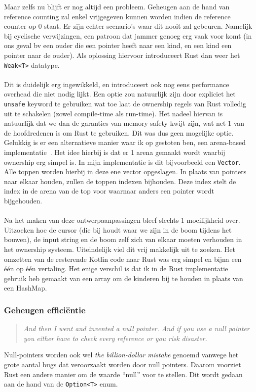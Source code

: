 Maar zelfs nu blijft er nog altijd een probleem.
Geheugen aan de hand van reference counting zal enkel vrijgegeven kunnen worden indien de reference counter op 0 staat.
Er zijn echter scenario's waar dit nooit zal gebeuren.
Namelijk bij cyclische verwijzingen, een patroon dat jammer genoeg erg vaak voor komt (in ons geval bv een ouder die een pointer heeft naar een kind, en een kind een pointer naar de ouder).
Als oplossing hiervoor introduceert Rust dan weer het \texttt{Weak<T>} datatype.
\\ \\
Dit is duidelijk erg ingewikkeld, en introduceert ook nog eens performance overhead die niet nodig lijkt.
Een optie zou natuurlijk zijn door expliciet het \texttt{unsafe} keyword te gebruiken wat toe laat de ownership regels van Rust volledig uit te schakelen (zowel compile-time als run-time).
Het nadeel hiervan is natuurlijk dat we dan de garanties van memory safety kwijt zijn, wat net 1 van de hoofdredenen is om Rust te gebruiken.
Dit was dus geen mogelijke optie.
Gelukkig is er een alternatieve manier waar ik op gestoten ben, een arena-based implementatie~\cite{rust_arena_trees}.
Het idee hierbij is dat er 1 arena gemaakt wordt waarbij ownership erg simpel is.
In mijn implementatie is dit bijvoorbeeld een \texttt{Vector}.
Alle toppen worden hierbij in deze ene vector opgeslagen.
In plaats van pointers naar elkaar houden, zullen de toppen indexen bijhouden.
Deze index stelt de index in de arena van de top voor waarnaar anders een pointer wordt bijgehouden.
\\ \\
Na het maken van deze ontwerpaanpassingen bleef slechts 1 moeilijkheid over.
Uitzoeken hoe de cursor (die bij houdt waar we zijn in de boom tijdens het bouwen), de input string en de boom zelf zich van elkaar moeten verhouden in het ownership systeem.
Uiteindelijk viel dit vrij makkelijk uit te zoeken.
Het omzetten van de resterende Kotlin code naar Rust was erg simpel en bijna een één op één vertaling.
Het enige verschil is dat ik in de Rust implementatie gebruik heb gemaakt van een array om de kinderen bij te houden in plaats van een HashMap.

\subsubsection{Geheugen efficiëntie}
\begin{quote}
    \textit{And then I went and invented a null pointer.
    And if you use a null pointer you either have to check every reference or you risk disaster. \cite{null_mistake}}
\end{quote}
Null-pointers worden ook wel \textit{the billion-dollar mistake} genoemd vanwege het grote aantal bugs dat veroorzaakt worden door null pointers.
Daarom voorziet Rust een andere manier om de waarde ``null'' voor te stellen.
Dit wordt gedaan aan de hand van de \texttt{Option<T>} enum.

